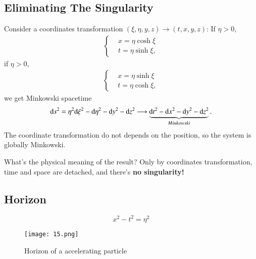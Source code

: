 \documentclass[openany,10pt]{book}
\theoremstyle{definition}
\theoremstyle{definition}
\theoremstyle{remark}
\begin{document}
\subsection{Eliminating The Singularity}\label{Rindlersing}
Consider a coordinates transformation $(\xi,\eta,y,z)\longrightarrow(t,x,y,z)$:
If $\eta >0$,
\begin{equation}
\begin{aligned}\begin{cases}
    &x=\eta \cosh{\xi}\\
    &t=\eta \sinh{\xi},
    \end{cases}
\end{aligned}
\end{equation}
if $\eta >0$,
\begin{equation}
\begin{aligned}\begin{cases}
    &x=\eta \sinh{\xi}\\
    &t=\eta \cosh{\xi},
    \end{cases}
\end{aligned}
\end{equation}
we get Minkowski spacetime
\begin{equation}
    {\rm d}s^2=\eta^2{\rm d}\xi^2-{\rm d}\eta^2-{\rm d}y^2-{\rm d}z^2 \longrightarrow \underbrace{{\rm d}t^2-{\rm d}x^2-{\rm d}y^2-{\rm d}z^2}_{Minkowski}.
\end{equation}
The coordinate transformation do not depends on the position, so the system is globally Minkowski.

What's the physical meaning of the result? Only by coordinates transformation, time and space are detached, and there's {\bfseries no singularity!}

\subsection{Horizon}
\begin{equation}
    x^2-t^2=\eta^2
\end{equation}
\begin{figure}[htbp]
  \centering
    \texttt{[image: 15.png]}
 \caption{Horizon of a accelerating particle}
\end{figure}
\end{document}
